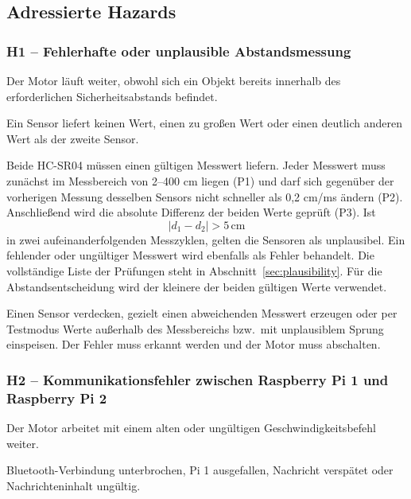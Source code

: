 \subsection{Adressierte Hazards}

\subsubsection{H1 -- Fehlerhafte oder unplausible Abstandsmessung}
\label{haz:h1}

Der Motor läuft weiter, obwohl sich ein Objekt bereits innerhalb des erforderlichen Sicherheitsabstands befindet.

Ein Sensor liefert keinen Wert, einen zu großen Wert oder einen deutlich anderen Wert als der zweite Sensor.

Beide HC-SR04 müssen einen gültigen Messwert liefern. Jeder Messwert muss
zunächst im Messbereich von 2--400 cm liegen (P1) und darf sich gegenüber der
vorherigen Messung desselben Sensors nicht schneller als 0{,}2 cm/ms ändern
(P2). Anschließend wird die absolute Differenz der beiden Werte geprüft (P3). Ist
\[
    |d_1-d_2| > 5\,\mathrm{cm}
\]
in zwei aufeinanderfolgenden Messzyklen, gelten die Sensoren als unplausibel.
Ein fehlender oder ungültiger Messwert wird ebenfalls als Fehler behandelt.
Die vollständige Liste der Prüfungen steht in Abschnitt~\ref{sec:plausibility}.
Für die Abstandsentscheidung wird der kleinere der beiden gültigen Werte
verwendet.


Einen Sensor verdecken, gezielt einen abweichenden Messwert erzeugen oder per
Testmodus Werte außerhalb des Messbereichs bzw.\ mit unplausiblem Sprung
einspeisen. Der Fehler muss erkannt werden und der Motor muss
abschalten.

\subsubsection{H2 -- Kommunikationsfehler zwischen Raspberry Pi 1 und Raspberry Pi 2}
\label{haz:h2}

Der Motor arbeitet mit einem alten oder ungültigen Geschwindigkeitsbefehl weiter.

Bluetooth-Verbindung unterbrochen, Pi 1 ausgefallen, Nachricht verspätet oder
Nachrichteninhalt ungültig.

